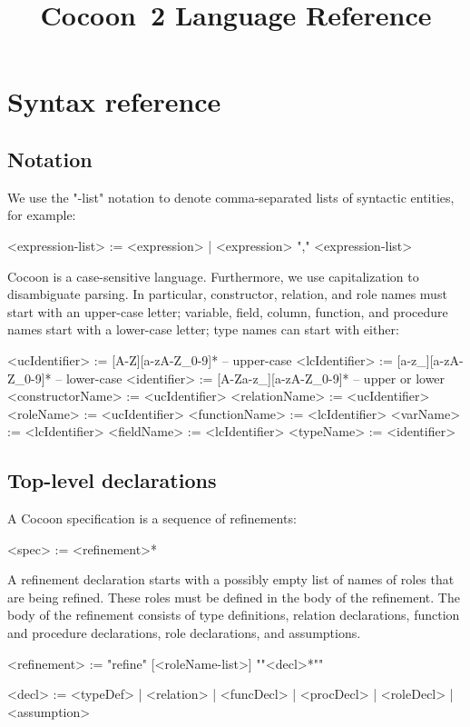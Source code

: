 \documentclass{report}
\title{Cocoon~2 Language Reference}
\begin{document}
\maketitle

\tableofcontents

\chapter{Syntax reference}\label{s:reference}

\section{Notation}

We use the "-list" notation to denote comma-separated lists of
syntactic entities, for example:

\begin{bnflisting}{}
<expression-list> := <expression> | <expression> "," <expression-list>
\end{bnflisting}

Cocoon is a case-sensitive language.  Furthermore, we use capitalization 
to disambiguate parsing.  In particular, constructor, relation, and role names must 
start with an upper-case letter; variable, field, column, function, and procedure names 
start with a lower-case letter; type names can start with either:

\begin{bnflisting}{}
<ucIdentifier> := [A-Z][a-zA-Z_0-9]*      -- upper-case
<lcIdentifier> := [a-z_][a-zA-Z_0-9]*     -- lower-case
<identifier>   := [A-Za-z_][a-zA-Z_0-9]*  -- upper or lower
<constructorName> := <ucIdentifier>
<relationName>    := <ucIdentifier>
<roleName>        := <ucIdentifier>
<functionName>    := <lcIdentifier>
<varName>         := <lcIdentifier>
<fieldName>       := <lcIdentifier>
<typeName>        := <identifier>
\end{bnflisting}



\section{Top-level declarations}

A Cocoon specification is a sequence of refinements:
\begin{bnflisting}{}
<spec> := <refinement>*
\end{bnflisting}

A refinement declaration starts with a possibly empty list of names of roles that 
are being refined.  These roles must be defined in the body of the refinement.
The body of the refinement consists of type definitions, relation
declarations, function and procedure declarations, 
role declarations, and assumptions.
\begin{bnflisting}{}
<refinement> := "refine" [<roleName-list>] 
                "{"<decl>*"}"

<decl> := <typeDef>
        | <relation>
        | <funcDecl>
        | <procDecl>
        | <roleDecl>
        | <assumption>
\end{bnflisting}
\end{document}
